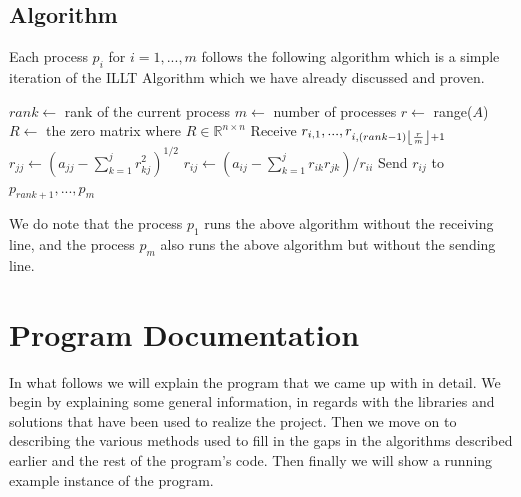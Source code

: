 \documentclass[11pt]{article}
\DeclarePairedDelimiter\floor{\lfloor}{\rfloor}
\theoremstyle{definition}
\begin{document}
\subsection{Algorithm}
Each process $p_i$ for $i=1,...,m$ follows the following algorithm which is a simple iteration of the ILLT Algorithm which we have already discussed and proven.
\begin{algorithmic}
\State $rank\gets$ rank of the current process
\State $m\gets$ number of processes
\State $r\gets$ range($A$)
\State $R\gets$ the zero matrix where $R\in\mathbb{R}^{n\times n}$
			\State Receive $r_{i,1},...,r_{i,(rank-1)\floor*{\frac{r}{m}}+1}$
		\EndIf
			\State $r_{jj}\gets (a_{jj}-\sum_{k=1}^{j}r_{kj}^2)^{1/2}$
		\Else
    			\State $r_{ij}\gets (a_{ij}-\sum_{k=1}^{j}r_{ik}r_{jk})/r_{ii}$
    		\EndIf
		\EndIf
		\State Send $r_{ij}$ to $p_{rank+1},...,p_m$
	\EndFor
\EndFor
\end{algorithmic}
We do note that the process $p_1$ runs the above algorithm without the receiving line, and the process $p_m$ also runs the above algorithm but without the sending line.

\section{Program Documentation}
In what follows we will explain the program that we came up with in detail. We begin by explaining some general information, in regards with the libraries and solutions that have been used to realize the project. Then we move on to describing the various methods used to fill in the gaps in the algorithms described earlier and the rest of the program's code. Then finally we will show a running example instance of the program.
\end{document}
